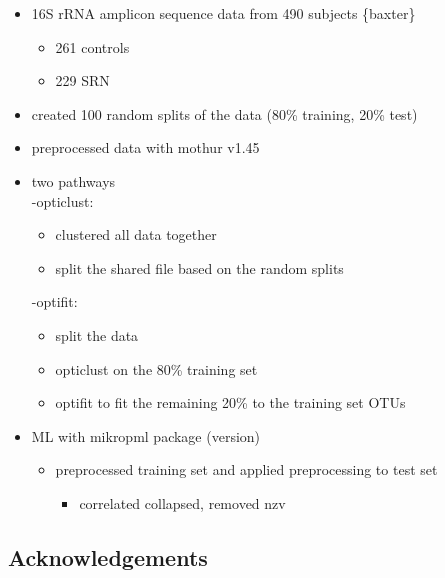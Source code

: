 \documentclass[
  11pt,
]{article}
\providecommand{\tightlist}{%
  \setlength{\itemsep}{0pt}\setlength{\parskip}{0pt}}
\begin{document}
\begin{itemize}
\tightlist
\item
  16S rRNA amplicon sequence data from 490 subjects \{baxter\}

  \begin{itemize}
  \tightlist
  \item
    261 controls
  \item
    229 SRN
  \end{itemize}
\item
  created 100 random splits of the data (80\% training, 20\% test)
\item
  preprocessed data with mothur v1.45
\item
  two pathways\\
  -opticlust:

  \begin{itemize}
  \tightlist
  \item
    clustered all data together
  \item
    split the shared file based on the random splits
  \end{itemize}

  -optifit:

  \begin{itemize}
  \tightlist
  \item
    split the data
  \item
    opticlust on the 80\% training set
  \item
    optifit to fit the remaining 20\% to the training set OTUs
  \end{itemize}
\item
  ML with mikropml package (version)

  \begin{itemize}
  \tightlist
  \item
    preprocessed training set and applied preprocessing to test set

    \begin{itemize}
    \tightlist
    \item
      correlated collapsed, removed nzv
    \end{itemize}
  \end{itemize}
\end{itemize}

\hypertarget{acknowledgements}{%
\subsection{Acknowledgements}\label{acknowledgements}}
\end{document}
